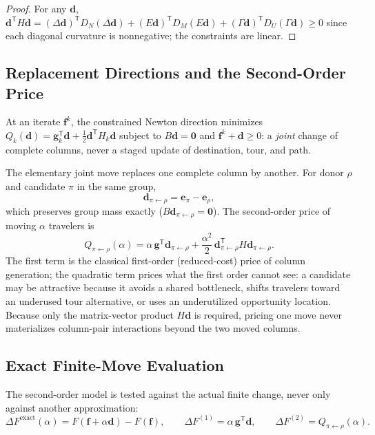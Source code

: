 \documentclass[10pt]{article}
\newcommand{\vect}[1]{\boldsymbol{#1}}
\newcommand{\T}{\mathsf{T}}
\begin{document}
\begin{proof}
For any $\vect d$,
$\vect d^\T H\vect d
=(\Delta\vect d)^\T D_N(\Delta\vect d)
+(E\vect d)^\T D_M(E\vect d)
+(\Gamma\vect d)^\T D_U(\Gamma\vect d)\geq 0$
since each diagonal curvature is nonnegative; the constraints are linear.
\end{proof}

\subsection{Replacement Directions and the Second-Order Price}
At an iterate $\vect f^k$, the constrained Newton direction minimizes $Q_k(\vect d)=\vect g_k^\T\vect d+\tfrac12\vect d^\T H_k\vect d$ subject to $B\vect d=\vect 0$ and $\vect f^k+\vect d\geq 0$: a \emph{joint} change of complete columns, never a staged update of destination, tour, and path.

The elementary joint move replaces one complete column by another. For donor $\rho$ and candidate $\pi$ in the same group,
\begin{equation}
\vect d_{\pi\leftarrow\rho}
=\vect e_\pi-\vect e_\rho,
\label{eq:replacement}
\end{equation}
which preserves group mass exactly ($B\vect d_{\pi\leftarrow\rho}=\vect 0$). The second-order price of moving $\alpha$ travelers is
\begin{equation}
Q_{\pi\leftarrow\rho}(\alpha)
=\alpha\,\vect g^\T\vect d_{\pi\leftarrow\rho}
+\frac{\alpha^{2}}{2}\,
\vect d_{\pi\leftarrow\rho}^\T H
\vect d_{\pi\leftarrow\rho}.
\label{eq:second_order_price}
\end{equation}
The first term is the classical first-order (reduced-cost) price of column generation; the quadratic term prices what the first order cannot see: a candidate may be attractive because it avoids a shared bottleneck, shifts travelers toward an underused tour alternative, or uses an underutilized opportunity location. Because only the matrix-vector product $H\vect d$ is required, pricing one move never materializes column-pair interactions beyond the two moved columns.

\subsection{Exact Finite-Move Evaluation}
The second-order model is tested against the actual finite change, never only against another approximation:
\begin{equation}
\Delta F^{\mathrm{exact}}(\alpha)
=F(\vect f+\alpha\vect d)-F(\vect f),
\qquad
\Delta F^{(1)}=\alpha\,\vect g^\T\vect d,
\qquad
\Delta F^{(2)}=Q_{\pi\leftarrow\rho}(\alpha).
\label{eq:exact}
\end{equation}
\end{document}
